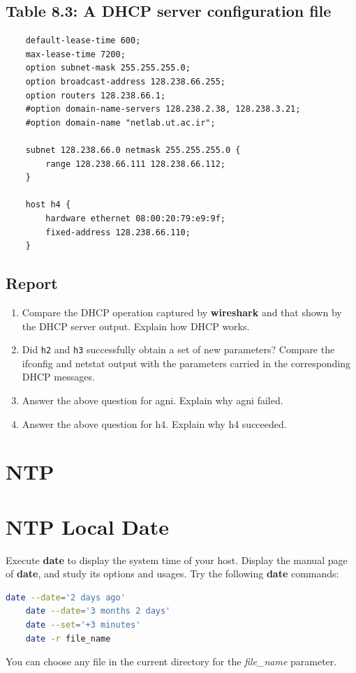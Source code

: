 \documentclass[10pt,a4paper]{article}
\numberwithin{equation}{section}
\numberwithin{figure}{section}
\numberwithin{table}{section}
\begin{document}
    \subsection*{Table 8.3: A DHCP server configuration file}
    \begin{verbatim}
    default-lease-time 600;
    max-lease-time 7200;
    option subnet-mask 255.255.255.0;
    option broadcast-address 128.238.66.255;
    option routers 128.238.66.1;
    #option domain-name-servers 128.238.2.38, 128.238.3.21;
    #option domain-name "netlab.ut.ac.ir";

    subnet 128.238.66.0 netmask 255.255.255.0 {
        range 128.238.66.111 128.238.66.112;
    }

    host h4 {
        hardware ethernet 08:00:20:79:e9:9f;
        fixed-address 128.238.66.110;
    }
    \end{verbatim}

    \subsection*{Report}
    \begin{enumerate}
        \item Compare the DHCP operation captured by \textbf{wireshark} and that shown by the DHCP server output.
        Explain how DHCP works.
        \item Did \texttt{h2} and \texttt{h3} successfully obtain a set of new parameters?
        Compare the ifconfig and netstat output with the parameters carried in the corresponding DHCP messages.
        \item Answer the above question for agni.
        Explain why agni failed.
        \item Answer the above question for h4.
        Explain why h4 succeeded.
    \end{enumerate}

    \section*{NTP}
    \section{NTP Local Date}
    Execute \textbf{date} to display the system time of your host. Display the manual page of \textbf{date}, and study its options and usages.
    Try the following \textbf{date} commands: \\
    \begin{lstlisting}[language=bash,
        basicstyle=\ttfamily,
        showstringspaces=false,
        commentstyle=\color{green},
        keywordstyle=\color{black}]
    date --date='2 days ago'
    date --date='3 months 2 days'
    date --set='+3 minutes'
    date -r file_name
    \end{lstlisting}
    You can choose any file in the current directory for the \textit{file\_name} parameter.
\end{document}
